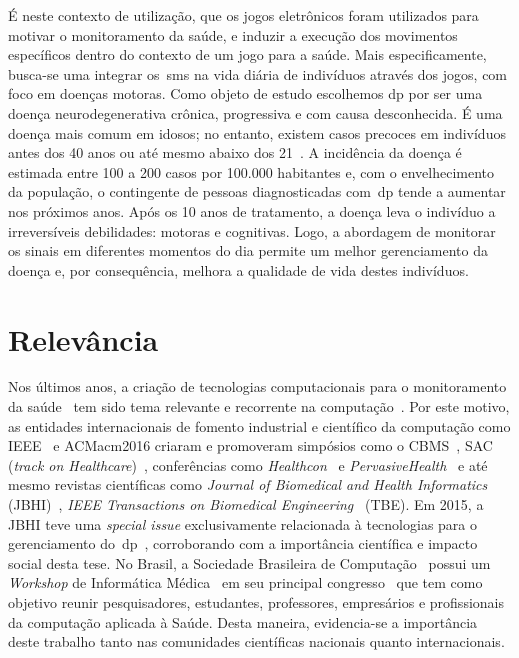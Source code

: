 É neste contexto de utilização, que os jogos eletrônicos foram utilizados para motivar o monitoramento da saúde, e induzir a execução dos movimentos específicos dentro do contexto de um jogo para a saúde. Mais especificamente, busca-se uma integrar os~\ac{sms} na vida diária de indivíduos através dos jogos, com foco em doenças motoras. Como objeto de estudo escolhemos \ac{dp} por ser uma doença neurodegenerativa crônica, progressiva e com causa desconhecida. É uma doença mais comum em idosos; no entanto, existem casos precoces em indivíduos antes dos 40 anos ou até mesmo abaixo dos 21~\cite{menezes2003}. A incidência da doença é estimada entre 100 a 200 casos por 100.000 habitantes e, com o envelhecimento da população, o contingente de pessoas diagnosticadas com~\ac{dp} tende a aumentar nos próximos anos. Após os 10 anos de tratamento, a doença leva o indivíduo a irreversíveis debilidades: motoras e cognitivas. Logo, a abordagem de monitorar os sinais em diferentes momentos do dia permite um melhor gerenciamento da doença e, por consequência, melhora a qualidade de vida destes indivíduos.


\section{Relevância}\label{section:relevancia}
Nos últimos anos, a criação de tecnologias computacionais para o monitoramento da saúde~\cite{bardram2008} tem sido tema relevante e recorrente na computação~\cite{bradmonitor2015,compapproachparkinson2015,mazilu2015}. Por este motivo, as entidades internacionais de fomento industrial e científico da computação como IEEE~\cite{ieee2016} e ACM{acm2016} criaram e promoveram simpósios como o CBMS~\cite{cbms2016}, SAC (\textit{track on Healthcare})~\cite{sachealth2016}, conferências como \textit{Healthcon}~\cite{healthcon2016} e \textit{PervasiveHealth}~\cite{pervasivehealth2016} e até mesmo revistas científicas como \textit{Journal of Biomedical and Health Informatics} (JBHI)~\cite{jbhi2016}, \textit{IEEE Transactions on Biomedical Engineering}~\cite{tbe2016} (TBE). Em 2015, a JBHI teve uma \textit{special issue} exclusivamente relacionada à tecnologias para o gerenciamento do~\ac{dp}~\cite{specjbhi2015}, corroborando com a importância científica e impacto social desta tese. No Brasil, a Sociedade Brasileira de Computação~\cite{sbc2016} possui um \textit{Workshop} de Informática Médica~\cite{wim2016} em seu principal congresso~\cite{csbc2016} que tem como objetivo reunir pesquisadores, estudantes, professores, empresários e profissionais da computação aplicada à Saúde. Desta maneira, evidencia-se a importância deste trabalho tanto nas comunidades científicas nacionais quanto internacionais.


